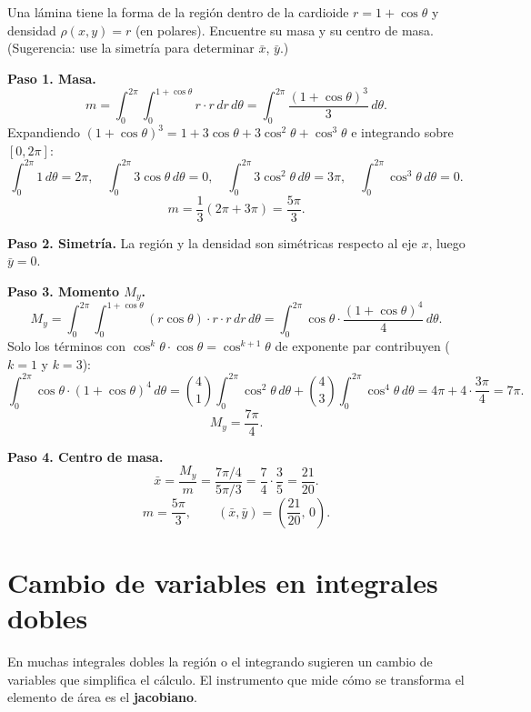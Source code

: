 \begin{prob}
Una lámina tiene la forma de la región dentro de la cardioide \(r=1+\cos\theta\) y densidad \(\rho(x,y)=r\) (en polares). Encuentre su masa y su centro de masa. (Sugerencia: use la simetría para determinar \(\bar{x}\), \(\bar{y}\).)
\begin{myproof}
\textbf{Paso 1. Masa.}
\[
m=\int_0^{2\pi}\int_0^{1+\cos\theta}r\cdot r\,dr\,d\theta
=\int_0^{2\pi}\frac{(1+\cos\theta)^3}{3}\,d\theta.
\]
Expandiendo $(1+\cos\theta)^3=1+3\cos\theta+3\cos^2\theta+\cos^3\theta$ e integrando sobre $[0,2\pi]$:
\[
\int_0^{2\pi}1\,d\theta=2\pi,\quad
\int_0^{2\pi}3\cos\theta\,d\theta=0,\quad
\int_0^{2\pi}3\cos^2\theta\,d\theta=3\pi,\quad
\int_0^{2\pi}\cos^3\theta\,d\theta=0.
\]
\[
m=\frac{1}{3}(2\pi+3\pi)=\frac{5\pi}{3}.
\]

\textbf{Paso 2. Simetría.} La región y la densidad son simétricas respecto al eje $x$, luego $\bar{y}=0$.

\textbf{Paso 3. Momento $M_y$.}
\[
M_y=\int_0^{2\pi}\int_0^{1+\cos\theta}(r\cos\theta)\cdot r\cdot r\,dr\,d\theta
=\int_0^{2\pi}\cos\theta\cdot\frac{(1+\cos\theta)^4}{4}\,d\theta.
\]
Solo los términos con $\cos^k\theta\cdot\cos\theta=\cos^{k+1}\theta$ de exponente par contribuyen ($k=1$ y $k=3$):
\[
\int_0^{2\pi}\cos\theta\cdot(1+\cos\theta)^4\,d\theta
=\binom{4}{1}\int_0^{2\pi}\cos^2\theta\,d\theta+\binom{4}{3}\int_0^{2\pi}\cos^4\theta\,d\theta
=4\pi+4\cdot\frac{3\pi}{4}=7\pi.
\]
\[
M_y=\frac{7\pi}{4}.
\]

\textbf{Paso 4. Centro de masa.}
\[
\bar{x}=\frac{M_y}{m}=\frac{7\pi/4}{5\pi/3}=\frac{7}{4}\cdot\frac{3}{5}=\frac{21}{20}.
\]
\[
\boxed{m=\frac{5\pi}{3},\qquad (\bar{x},\bar{y})=\left(\frac{21}{20},\,0\right).}
\]
\end{myproof}
\end{prob}

\section{Cambio de variables en integrales dobles}
\label{sec:cambio-var-dobles}

En muchas integrales dobles la región o el integrando sugieren un cambio
de variables que simplifica el cálculo. El instrumento que mide cómo se
transforma el elemento de área es el \textbf{jacobiano}.

